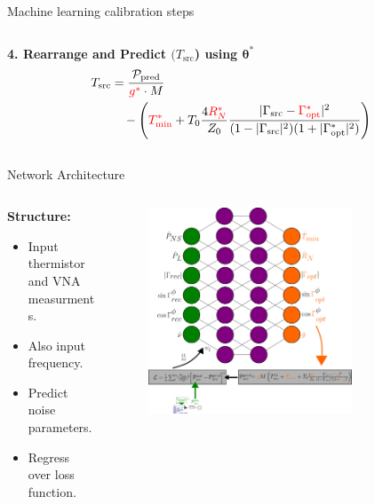 \documentclass[aspectratio=169]{beamer}
\begin{document}
\begin{frame}{\small{Machine learning calibration steps}}
\begin{columns}
\begin{column}{0.5\textwidth}
			\textbf{4. Rearrange and Predict $(T_{\text{src}}$) using $\boldsymbol{\theta}^{*}$}
			\begin{align}
				T_{\text{src}} & = \frac{\mathcal{P}_{\text{pred}}}{\textcolor{red}{g^*} \cdot M} \nonumber \\
				               & \quad - \left( \textcolor{red}{T_{\text{min}}^*}
				+ T_0 \frac{4\textcolor{red}{R_N^*}}{Z_0} \frac{|\Gamma_{\text{src}} - \textcolor{red}{\Gamma_{\text{opt}}^*}|^2}{(1 - |\Gamma_{\text{src}}|^2)(1 + |\Gamma_{\text{opt}}^*|^2)} \right)
			\end{align}
			\vfill
		\end{column}
	\end{columns}
\end{frame}

\begin{frame}{\small{Network Architecture}}
	\begin{columns}
		\begin{column}{0.35\textwidth}
			\textbf{Structure:}
			\begin{itemize}
				\item Input thermistor and VNA measurments.
				\item Also input frequency.
				\item Predict noise parameters.
				\item Regress over loss function.
			\end{itemize}
		\end{column}

		\begin{column}{0.65\textwidth}
			\begin{figure}
				\centering
				\includegraphics[width=0.75\textwidth]{images/nn.png}
			\end{figure}
		\end{column}
	\end{columns}
	\vfill
\end{frame}
\end{document}
